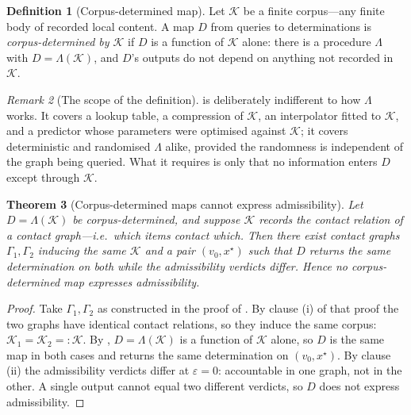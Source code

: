 \documentclass[11pt,twocolumn,a4paper]{article}
\theoremstyle{dirthm}
\newtheorem{theorem}{Theorem}[section]
\theoremstyle{definition}
\newtheorem{definition}[theorem]{Definition}
\theoremstyle{remark}
\newtheorem{remark}[theorem]{Remark}
\newcommand{\Gph}{\Gamma}
\newcommand{\eps}{\varepsilon}
\begin{document}
\begin{definition}[Corpus-determined map]
\label{def:corpus-map}
Let $\mathcal{K}$ be a finite corpus---any finite body of recorded local
content. A map $D$ from queries to determinations is \emph{corpus-determined
by $\mathcal{K}$} if $D$ is a function of $\mathcal{K}$ alone: there is a
procedure $\Lambda$ with $D=\Lambda(\mathcal{K})$, and $D$'s outputs do not
depend on anything not recorded in $\mathcal{K}$.
\end{definition}

\begin{remark}[The scope of the definition]
\label{rem:corpus-scope}
 is deliberately indifferent to how $\Lambda$ works. It
covers a lookup table, a compression of $\mathcal{K}$, an interpolator fitted
to $\mathcal{K}$, and a predictor whose parameters were optimised against
$\mathcal{K}$; it covers deterministic and randomised $\Lambda$ alike,
provided the randomness is independent of the graph being queried. What it
requires is only that no information enters $D$ except through
$\mathcal{K}$.
\end{remark}

\begin{theorem}[Corpus-determined maps cannot express admissibility]
\label{thm:corpus-separation}
Let $D=\Lambda(\mathcal{K})$ be corpus-determined, and suppose $\mathcal{K}$
records the contact relation of a contact graph---i.e.\ which items contact
which. Then there exist contact graphs $\Gph_1,\Gph_2$ inducing the same
$\mathcal{K}$ and a pair $(v_0,x^{\star})$ such that $D$ returns the same
determination on both while the admissibility verdicts differ. Hence no
corpus-determined map expresses admissibility.
\end{theorem}

\begin{proof}
Take $\Gph_1,\Gph_2$ as constructed in the proof of
. By clause (i) of that proof the two graphs have
identical contact relations, so they induce the same corpus:
$\mathcal{K}_1=\mathcal{K}_2=:\mathcal{K}$. By ,
$D=\Lambda(\mathcal{K})$ is a function of $\mathcal{K}$ alone, so $D$ is the
same map in both cases and returns the same determination on
$(v_0,x^{\star})$. By clause (ii) the admissibility verdicts differ at
$\eps=0$: accountable in one graph, not in the other. A single output cannot
equal two different verdicts, so $D$ does not express admissibility.
\end{proof}
\end{document}
